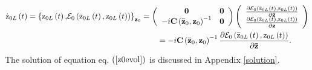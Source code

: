 \documentclass[aps,preprint]{revtex4}%
\begin{document}
\begin{align}
\mathrm{\dot{z}}_{0L}\left(  t\right)   &  =\left\{  \mathrm{z}_{0L}\left(
t\right)  \mathbf{,}\mathcal{E}_{0}\left(  \mathrm{\bar{z}}_{0L}\left(
t\right)  ,\mathrm{z}_{0L}\left(  t\right)  \right)  \right\}  _{\mathbf{z}%
_{0}}=\left(
\begin{array}
[c]{cc}%
\mathbf{0} & \mathbf{0}\\
-i\mathbf{C}\left(  \mathbf{\bar{z}}_{0},\mathbf{z}_{0}\right)  ^{-1} &
\mathbf{0}%
\end{array}
\right)  \left(
\begin{array}
[c]{c}%
\frac{\partial\mathcal{E}_{0}\left(  \mathrm{\bar{z}}_{0L}\left(  t\right)
,\mathrm{z}_{0L}\left(  t\right)  \right)  }{\partial\mathbf{\bar{z}}}\\
\frac{\partial\mathcal{E}_{0}\left(  \mathrm{\bar{z}}_{0L}\left(  t\right)
,\mathrm{z}_{0L}\left(  t\right)  \right)  }{\partial\mathbf{z}}%
\end{array}
\right) \nonumber\\
&  \left.  \qquad\qquad\qquad\qquad\qquad\qquad\qquad\qquad\right.
=-i\mathbf{C}\left(  \mathbf{\bar{z}}_{0},\mathbf{z}_{0}\right)  ^{-1}%
\frac{\partial\mathcal{E}_{0}\left(  \mathrm{\bar{z}}_{0L}\left(  t\right)
,\mathrm{z}_{0L}\left(  t\right)  \right)  }{\partial\mathbf{\bar{z}}}.
\label{z0evol}%
\end{align}
The solution of equation eq. $\left(  \ref{z0evol}\right)  $ is discussed in
Appendix \ref{solution}.
\end{document}
